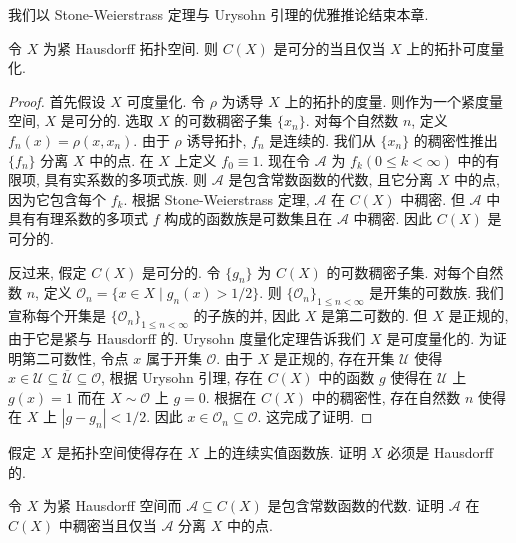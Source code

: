 \documentclass[../../main.tex]{subfiles}
\begin{document}
我们以 Stone-Weierstrass 定理与 Urysohn 引理的优雅推论结束本章.

\begin{theorem}[Borsuk 定理]\label{theorem:ch12-Borsuk}
令 $X$ 为紧 Hausdorff 拓扑空间. 则 $C(X)$ 是可分的当且仅当 $X$ 上的拓扑可度量化.
\end{theorem}

\begin{proof}
首先假设 $X$ 可度量化. 令 $\rho$ 为诱导 $X$ 上的拓扑的度量. 则作为一个紧度量空间, $X$ 是可分的. 选取 $X$ 的可数稠密子集 $\{x_{n}\}$. 对每个自然数 $n$, 定义 $f_{n}(x)=\rho(x,x_{n})$. 由于 $\rho$ 诱导拓扑, $f_{n}$ 是连续的. 我们从 $\{x_{n}\}$ 的稠密性推出 $\{f_{n}\}$ 分离 $X$ 中的点. 在 $X$ 上定义 $f_{0}\equiv 1$. 现在令 $\mathcal{A}$ 为 $f_{k}(0\leqslant k<\infty)$ 中的有限项, 具有实系数的多项式族. 则 $\mathcal{A}$ 是包含常数函数的代数, 且它分离 $X$ 中的点, 因为它包含每个 $f_{k}$. 根据 Stone-Weierstrass 定理, $\mathcal{A}$ 在 $C(X)$ 中稠密. 但 $\mathcal{A}$ 中具有有理系数的多项式 $f$ 构成的函数族是可数集且在 $\mathcal{A}$ 中稠密. 因此 $C(X)$ 是可分的.

反过来, 假定 $C(X)$ 是可分的. 令 $\{g_{n}\}$ 为 $C(X)$ 的可数稠密子集. 对每个自然数 $n$, 定义 $\mathcal{O}_{n}=\{x\in X\mid g_{n}(x)>1/2\}$. 则 $\{\mathcal{O}_{n}\}_{1\leqslant n<\infty}$ 是开集的可数族. 我们宣称每个开集是 $\{\mathcal{O}_{n}\}_{1\leqslant n<\infty}$ 的子族的并, 因此 $X$ 是第二可数的. 但 $X$ 是正规的, 由于它是紧与 Hausdorff 的. Urysohn 度量化定理告诉我们 $X$ 是可度量化的. 为证明第二可数性, 令点 $x$ 属于开集 $\mathcal{O}$. 由于 $X$ 是正规的, 存在开集 $\mathcal{U}$ 使得 $x\in\mathcal{U}\subseteq\overline{\mathcal{U}}\subseteq\mathcal{O}$, 根据 Urysohn 引理, 存在 $C(X)$ 中的函数 $g$ 使得在 $\mathcal{U}$ 上 $g(x)=1$ 而在 $X\sim\mathcal{O}$ 上 $g=0$. 根据在 $C(X)$ 中的稠密性, 存在自然数 $n$ 使得在 $X$ 上 $|g-g_{n}|<1/2$. 因此 $x\in\mathcal{O}_{n}\subseteq\mathcal{O}$. 这完成了证明.
\end{proof}

\begin{exercise}\label{exercise:ch12-24}
假定 $X$ 是拓扑空间使得存在 $X$ 上的连续实值函数族. 证明 $X$ 必须是 Hausdorff 的.
\end{exercise}

\begin{exercise}\label{exercise:ch12-25}
令 $X$ 为紧 Hausdorff 空间而 $\mathcal{A}\subseteq C(X)$ 是包含常数函数的代数. 证明 $\mathcal{A}$ 在 $C(X)$ 中稠密当且仅当 $\mathcal{A}$ 分离 $X$ 中的点.
\end{exercise}
\end{document}
